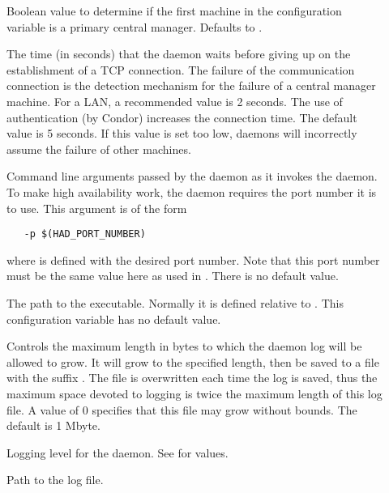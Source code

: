 \begin{description}
\item[]
  \label{param:HADUsePrimary}
  Boolean value to determine if the first machine in the 
   configuration variable is
  a primary central manager.
  Defaults to .


\item[]
  \label{param:HADConnectionTimeout}
  The time (in seconds) that the  daemon waits before giving
  up on the establishment of a TCP connection.
  The failure of the communication connection
  is the detection mechanism for the failure of a central
  manager machine.
  For a LAN, a recommended value is 2 seconds.
  The use of authentication (by Condor) increases the connection
  time.
  The default value is 5 seconds.
  If this value is set too low,
   daemons will incorrectly assume
  the failure of other machines.

\item[]
  \label{param:HADArgs}
  Command line arguments passed by the  daemon
  as it invokes the  daemon.
  To make high availability work, the  daemon
  requires the port number it is to use.
  This argument is of the form
  \begin{verbatim}
   -p $(HAD_PORT_NUMBER)
  \end{verbatim}
  where  is defined with the
  desired port number.
  Note that this port number must be the same value here as
  used in .
  There is no default value.


\item[]
  \label{param:HAD}
  The path to the  executable. Normally it is defined
  relative to .
  This configuration variable has no default value.

\item[]
  \label{param:MaxHADLog}
  Controls the maximum length in bytes to which the 
  daemon log will be allowed to grow. It will grow to the specified length,
  then be saved to a file with the suffix . 
  The   file is overwritten each time the log is saved,
  thus the maximum space devoted to logging is twice the maximum length
  of this log file.
  A value of 0 specifies that this file may grow without bounds.
  The default is 1 Mbyte.

\item[]
  \label{param:HADDebug}
  Logging level for the  daemon.
  See  for values.

\item[]
  \label{param:HADLog}
  Path to the log file.

\end{description}


